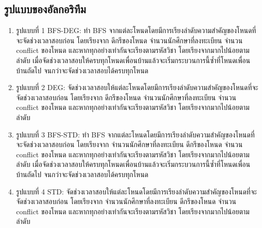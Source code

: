 \subsection{รูปแบบของอัลกอริทึม}
\label{subsec:sorting_type}
\begin{enumerate}
  \item รูปแบบที่ 1 BFS-DEG: ทำ BFS จากแต่ละโหนดโดยมีการเรียงลำดับความสำคัญของโหนดที่จะจัดช่วงเวลาสอบก่อน โดยเรียงจาก
  ดีกรีของโหนด จำนวนนักศึกษาที่ลงทะเบียน จำนวน conflict ของโหนด และหากทุกอย่างเท่ากันจะเรียงตามรหัสวิชา โดยเรียงจากมากไปน้อยตามลำดับ
  เมื่อจัดช่วงเวลาสอบให้ครบทุกโหนดเพื่อนบ้านแล้วจะเริ่มกระบวนการนี้ซ้ำที่โหนดเพื่อนบ้านถัดไป จนกว่าจะจัดช่วงเวลาสอบได้ครบทุกโหนด
  \item รูปแบบที่ 2 DEG: จัดช่วงเวลาสอบให้แต่ละโหนดโดยมีการเรียงลำดับความสำคัญของโหนดที่จะจัดช่วงเวลาสอบก่อน โดยเรียงจาก
  ดีกรีของโหนด จำนวนนักศึกษาที่ลงทะเบียน จำนวน conflict ของโหนด และหากทุกอย่างเท่ากันจะเรียงตามรหัสวิชา โดยเรียงจากมากไปน้อยตามลำดับ
  \item รูปแบบที่ 3 BFS-STD: ทำ BFS จากแต่ละโหนดโดยมีการเรียงลำดับความสำคัญของโหนดที่จะจัดช่วงเวลาสอบก่อน โดยเรียงจาก
  จำนวนนักศึกษาที่ลงทะเบียน ดีกรีของโหนด จำนวน conflict ของโหนด และหากทุกอย่างเท่ากันจะเรียงตามรหัสวิชา โดยเรียงจากมากไปน้อยตามลำดับ
  เมื่อจัดช่วงเวลาสอบให้ครบทุกโหนดเพื่อนบ้านแล้วจะเริ่มกระบวนการนี้ซ้ำที่โหนดเพื่อนบ้านถัดไป จนกว่าจะจัดช่วงเวลาสอบได้ครบทุกโหนด
  \item รูปแบบที่ 4 STD: จัดช่วงเวลาสอบให้แต่ละโหนดโดยมีการเรียงลำดับความสำคัญของโหนดที่จะจัดช่วงเวลาสอบก่อน โดยเรียงจาก
  จำนวนนักศึกษาที่ลงทะเบียน ดีกรีของโหนด จำนวน conflict ของโหนด และหากทุกอย่างเท่ากันจะเรียงตามรหัสวิชา โดยเรียงจากมากไปน้อยตามลำดับ
\end{enumerate}

